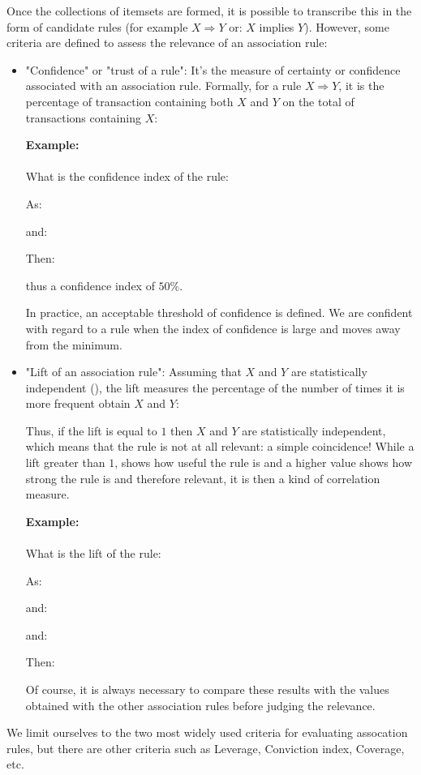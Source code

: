 	Once the collections of itemsets are formed, it is possible to transcribe this in the form of candidate rules (for example $X\Rightarrow Y$ or: $X$ implies $Y$). However, some criteria are defined to assess the relevance of an association rule:
	\begin{itemize}
		\item "Confidence" or "trust of a rule": It's the measure of certainty or confidence associated with an association rule. Formally, for a rule $X \Rightarrow Y$, it is the percentage of transaction containing both $X$ and $Y$ on the total of transactions containing $X$:
		
		\begin{tcolorbox}[colframe=black,colback=white,sharp corners]
		\textbf{{\Large {}}Example:}\\\\
		What is the confidence index of the rule:
		
		As:
		
		and:
		
		Then:
		
		thus a confidence index of $50\%$. 
		\end{tcolorbox}
		In practice, an acceptable threshold of confidence is defined. We are confident with regard to a rule when the index of confidence is large and moves away from the minimum.
		
		\item "Lift of an association rule": Assuming that $X$ and $Y$ are statistically independent (), the lift measures the percentage of the number of times it is more frequent obtain $X$ and $Y$:
		
		Thus, if the lift is equal to $1$ then $X$ and $Y$ are statistically independent, which means that the rule is not at all relevant: a simple coincidence! While a lift greater than $1$, shows how useful the rule is and a higher value shows how strong the rule is and therefore relevant, it is then a kind of correlation measure.
		\begin{tcolorbox}[colframe=black,colback=white,sharp corners]
		\textbf{{\Large {}}Example:}\\\\
		What is the lift of the rule:
		
		As:
		
		and:
		
		and:
		
		Then:
		
		Of course, it is always necessary to compare these results with the values obtained with the other association rules before judging the relevance.
		\end{tcolorbox}
	\end{itemize}
	We limit ourselves to the two most widely used criteria for evaluating assocation rules, but there are other criteria such as Leverage, Conviction index, Coverage, etc.

